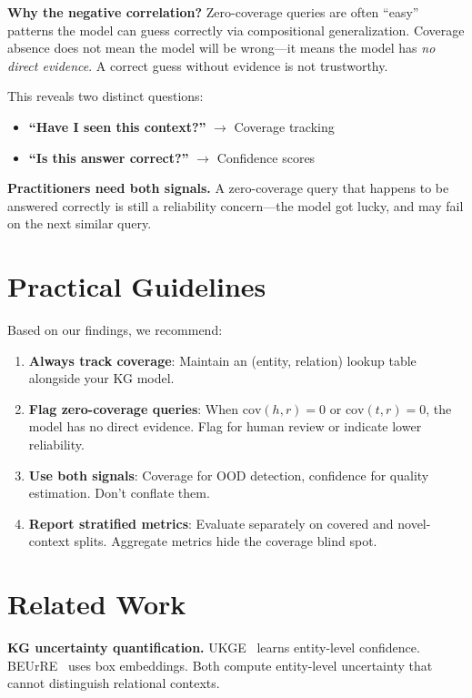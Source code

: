 \documentclass{article}
\begin{document}
\textbf{Why the negative correlation?} Zero-coverage queries are often ``easy'' patterns the model can guess correctly via compositional generalization. Coverage absence does not mean the model will be wrong---it means the model has \emph{no direct evidence}. A correct guess without evidence is not trustworthy.

This reveals two distinct questions:
\begin{itemize}
    \item \textbf{``Have I seen this context?''} $\to$ Coverage tracking
    \item \textbf{``Is this answer correct?''} $\to$ Confidence scores
\end{itemize}

\textbf{Practitioners need both signals.} A zero-coverage query that happens to be answered correctly is still a reliability concern---the model got lucky, and may fail on the next similar query.

\section{Practical Guidelines}
\label{sec:guidelines}

Based on our findings, we recommend:

\begin{enumerate}
    \item \textbf{Always track coverage}: Maintain an (entity, relation) lookup table alongside your KG model.

    \item \textbf{Flag zero-coverage queries}: When $\text{cov}(h,r) = 0$ or $\text{cov}(t,r) = 0$, the model has no direct evidence. Flag for human review or indicate lower reliability.

    \item \textbf{Use both signals}: Coverage for OOD detection, confidence for quality estimation. Don't conflate them.

    \item \textbf{Report stratified metrics}: Evaluate separately on covered and novel-context splits. Aggregate metrics hide the coverage blind spot.
\end{enumerate}

\section{Related Work}

\textbf{KG uncertainty quantification.} UKGE~\citep{chen2019embedding} learns entity-level confidence. BEUrRE~\citep{chen2021probabilistic} uses box embeddings. Both compute entity-level uncertainty that cannot distinguish relational contexts.
\end{document}
